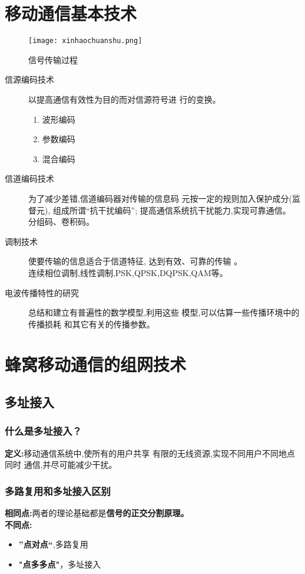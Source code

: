 	\section{移动通信基本技术}
		\begin{figure}[H]
			\centering
			\texttt{[image: xinhaochuanshu.png]}
			\caption{信号传输过程}
		\end{figure}
	\begin{description}
		\item[信源编码技术
		] 以提高通信有效性为目的而对信源符号进
		行的变换。
		\begin{enumerate}
			\item 波形编码
			\item 参数编码
			\item 混合编码
		\end{enumerate}
		\item[信道编码技术
		] 为了减少差错,信道编码器对传输的信息码
		元按一定的规则加入保护成分(监督元),
		组成所谓“抗干扰编码”;
		提高通信系统抗干扰能力,实现可靠通信。\\分组码、卷积码。
		\item[调制技术
		] 使要传输的信息适合于信道特征,
		达到有效、可靠的传输 。\\连续相位调制,线性调制,PSK,QPSK,DQPSK,QAM等。
		\item[电波传播特性的研究
		]  总结和建立有普遍性的数学模型,利用这些
		模型,可以估算一些传播环境中的传播损耗
		和其它有关的传播参数。
	\end{description}
	\section{蜂窝移动通信的组网技术}
	\subsection{多址接入}
	\subsubsection{什么是多址接入？}
	\textbf{定义:}移动通信系统中,使所有的用户共享
	有限的无线资源,实现不同用户不同地点同时
	通信,并尽可能减少干扰。
	\subsubsection{多路复用和多址接入区别}
	\textbf{相同点:}两者的理论基础都是\textbf{信号的正交分割原理。}\\
	\textbf{不同点:}
	\begin{itemize}
		\item \textbf{”点对点“},多路复用
		\item \textbf{"点多多点"}，多址接入
	\end{itemize}
	
